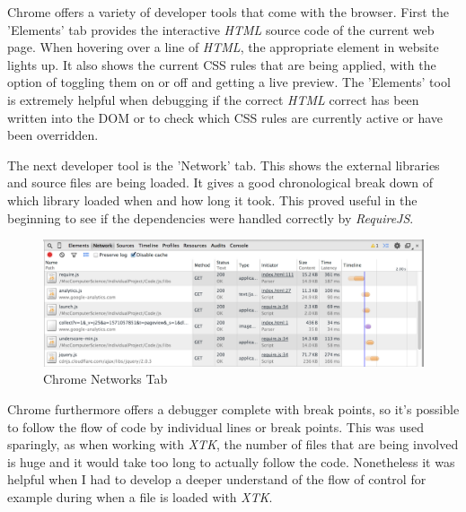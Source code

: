 \documentclass[a4paper,11pt,twoside]{article}
\begin{document}
Chrome offers a variety of developer tools that come with the browser. First the 'Elements' tab provides the interactive \textit{HTML} source code of the current web page. When hovering over a line of \textit{HTML}, the appropriate element in website lights up. It also shows the current CSS rules that are being applied, with the option of toggling them on or off and getting a live preview. The 'Elements' tool is extremely helpful when debugging if the correct \textit{HTML} correct has been written into the DOM or to check which CSS rules are currently active or have been overridden.


The next developer tool is the 'Network' tab. This shows the external libraries and source files are being loaded. It gives a good chronological break down of which library loaded when and how long it took. This proved useful in the beginning to see if the dependencies were handled correctly by \textit{RequireJS}.

\begin{figure}[ht!]
\centering
\includegraphics[width=140mm]{graphics/chromeNetwork_01.png}
\caption{Chrome Networks Tab}
\label{fig:UIdesign1}
\end{figure}


Chrome furthermore offers a debugger complete with break points, so it's possible to follow the flow of code  by individual lines or break points. This was used sparingly, as when working with \textit{XTK}, the number of files that are being involved is huge and it would take too long to actually follow the code. Nonetheless it was helpful when I had to develop a deeper understand of the flow of control for example during when a file is loaded with \textit{XTK}.
\end{document}
